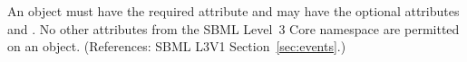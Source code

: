 An \EventAssignment object must have the required attribute
 and may have the optional attributes  and
.  No other attributes from the SBML Level~3 Core namespace
are permitted on an \EventAssignment object.  (References: SBML L3V1
Section~\ref{sec:events}.)
